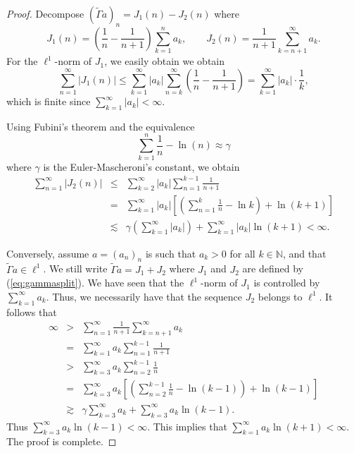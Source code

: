 \documentclass[12pt,a4paper]{amsart}
\theoremstyle{definition}
\begin{document}
\begin{proof}
Decompose $(\tilde{\Gamma}a)_n = J_1(n) - J_2(n)$ where
\begin{equation}\label{eq:gammasplit}
  J_1(n) = \left(\frac{1}{n}-\frac{1}{n+1}\right)\sum_{k=1}^n a_k,
  \qquad
  J_2(n) = \frac{1}{n+1}\sum_{k=n+1}^\infty a_k.
\end{equation}
For the $\ell^1$-norm of $J_1$, we easily obtain
we obtain
\[
  \sum_{n=1}^\infty |J_1(n)|
  \le \sum_{k=1}^\infty |a_k|\sum_{n=k}^\infty \left(\frac{1}{n}-\frac{1}{n+1}\right)
  = \sum_{k=1}^\infty|a_k|\cdot\frac{1}{k},
\]
which is finite since $\sum_{k=1}^\infty |a_k|<\infty$.

Using Fubini's theorem and the equivalence
$$\sum_{k=1}^n\frac{1}{n}-\ln(n)\approx \gamma$$
where $\gamma$ is the Euler-Mascheroni's constant, we obtain
\begin{eqnarray*}
  \sum_{n=1}^\infty|J_2(n)|
  &\le& \sum_{k=2}^\infty |a_k|\sum_{n=1}^{k-1}\frac{1}{n+1}\\
 &=& \sum_{k=1}^\infty |a_k|\left[\left(\sum_{n=1}^{k}\frac{1}{n}-\ln k\right)+\ln(k+1)\right]\\ &\lesssim& \gamma\left(\sum_{k=1}^\infty |a_k|\right)+\sum_{k=1}^\infty |a_k|\ln(k+1)<\infty.
\end{eqnarray*}

Conversely, assume $a=(a_n)_n$ is such that $a_k>0$ for all $k\in\mathbb{N}$, and that $\tilde{\Gamma}a\in\ell^1$. We still write $\tilde{\Gamma}a= J_1+J_2$ where $J_1$ and $J_2$ are defined by (\ref{eq:gammasplit}). We have seen that the $\ell^1$-norm of $J_1$ is controlled by $\sum_{k=1}^\infty a_k$. Thus, we necessarily have that the sequence $J_2$ belongs to $\ell^1$. It follows that
\begin{eqnarray*}
    \infty &>& \sum_{n=1}^\infty\frac{1}{n+1}\sum_{k=n+1}^\infty a_k\\ &=& \sum_{k=1}^\infty a_k\sum_{n=1}^{k-1}\frac{1}{n+1}\\ &>& \sum_{k=3}^\infty a_k\sum_{n=2}^{k-1}\frac{1}{n}\\ &=& \sum_{k=3}^\infty a_k\left[\left(\sum_{n=2}^{k-1}\frac{1}{n}-\ln(k-1)\right)+\ln(k-1)\right]\\ &\gtrsim& \gamma\sum_{k=3}^\infty a_k+\sum_{k=3}^\infty a_k\ln(k-1).
\end{eqnarray*}
Thus $\displaystyle\sum_{k=3}^\infty a_k\ln(k-1)<\infty$. This implies that $\displaystyle\sum_{k=1}^\infty a_k\ln(k+1)<\infty$. The proof is complete.
\end{proof}
\end{document}
